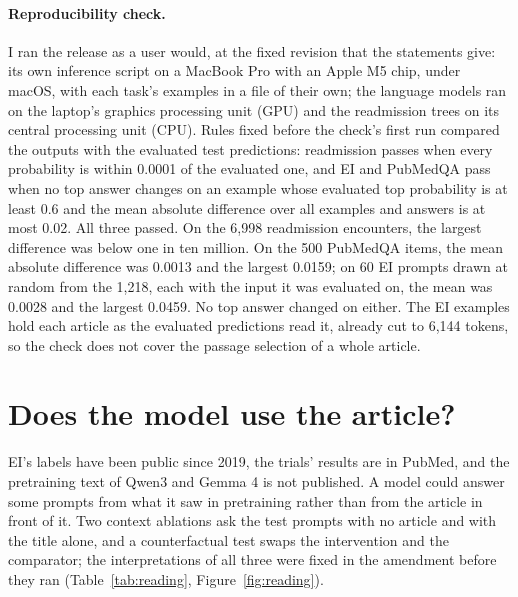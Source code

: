 \documentclass[11pt,letterpaper]{article}
\begin{document}
\paragraph{Reproducibility check.} I ran the release as a user would, at the fixed revision that the statements give: its own inference script on a MacBook Pro with an Apple M5 chip, under macOS, with each task's examples in a file of their own; the language models ran on the laptop's graphics processing unit (GPU) and the readmission trees on its central processing unit (CPU). Rules fixed before the check's first run compared the outputs with the evaluated test predictions: readmission passes when every probability is within 0.0001 of the evaluated one, and EI and PubMedQA pass when no top answer changes on an example whose evaluated top probability is at least 0.6 and the mean absolute difference over all examples and answers is at most 0.02. All three passed. On the 6,998 readmission encounters, the largest difference was below one in ten million. On the 500 PubMedQA items, the mean absolute difference was 0.0013 and the largest 0.0159; on 60 EI prompts drawn at random from the 1,218, each with the input it was evaluated on, the mean was 0.0028 and the largest 0.0459. No top answer changed on either. The EI examples hold each article as the evaluated predictions read it, already cut to 6,144 tokens, so the check does not cover the passage selection of a whole article.

\section{Does the model use the article?}
\label{sec:reading}

EI's labels have been public since 2019, the trials' results are in PubMed, and the pretraining text of Qwen3 and Gemma 4 is not published. A model could answer some prompts from what it saw in pretraining rather than from the article in front of it. Two context ablations ask the test prompts with no article and with the title alone, and a counterfactual test swaps the intervention and the comparator; the interpretations of all three were fixed in the amendment before they ran (Table~\ref{tab:reading}, Figure~\ref{fig:reading}).

\begin{table}[t]
\centering\footnotesize
\caption{Context ablations and the swap test on Evidence Inference 2.0's test split (pre-registered, with interpretations fixed in advance). Each cell gives the estimate and its 95 percent interval from 1,000 article resamples. The title-only input leaves out the 9 prompts whose article gives no title; the title's difference is computed on the prompts in both inputs. ``Direction answers'' are ``significantly increased'' and ``significantly decreased''; for them the swapped prompt's expected answer is the other direction.}
\label{tab:reading}

\end{table}
\end{document}
